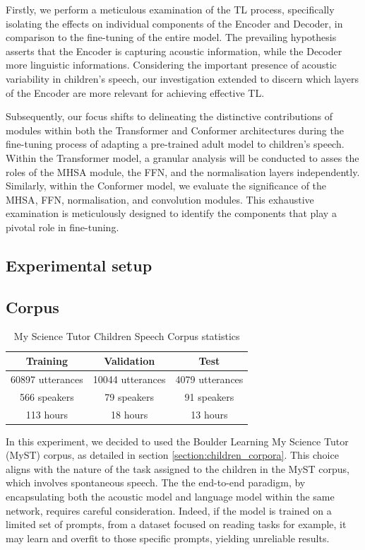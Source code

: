 Firstly, we perform a meticulous examination of the \ac{TL} process, specifically isolating the effects on individual components of the Encoder and Decoder, in comparison to the fine-tuning of the entire model. The prevailing hypothesis asserts that the Encoder is  capturing acoustic information, while the Decoder more linguistic informations. Considering the important presence of acoustic variability in children's speech, our investigation extended to discern which layers of the Encoder are more relevant for achieving effective \ac{TL}.

Subsequently, our focus shifts to delineating the distinctive contributions of modules within both the Transformer and Conformer architectures during the fine-tuning process of adapting a pre-trained adult model to children's speech. Within the Transformer model, a granular analysis will be conducted to asses the roles of the \ac{MHSA} module, the \ac{FFN}, and the normalisation layers independently. Similarly, within the Conformer model, we evaluate the significance of the \ac{MHSA}, \ac{FFN}, normalisation, and convolution modules. This exhaustive examination is meticulously designed to identify the components that play a pivotal role in fine-tuning.


\subsection{Experimental setup}
\label{section:methods_chapter4}

\subsection{Corpus}
\begin{table}[ht]
\centering
\begin{tabular}{c|c|c}
\hline
 Training & Validation     & Test   \\ \hline
60897 utterances  & 10044 utterances   & 4079 utterances \\ 
 566 speakers  & 79 speakers   & 91 speakers \\ 
 113 hours  & 18 hours   & 13 hours \\ \hline

\end{tabular}
\caption{My Science Tutor Children Speech Corpus statistics}
\label{tab:statistics_myst}
\end{table}
In this experiment, we decided to used  the Boulder Learning My Science Tutor (MyST) corpus, as detailed in section \ref{section:children_corpora}. This choice aligns with the nature of the task assigned to the children in the MyST corpus, which involves spontaneous speech. The the end-to-end paradigm, by encapsulating both the acoustic model and language model within the same network, requires careful consideration. Indeed, if the model is trained on a limited set of prompts, from a dataset focused on reading tasks for example, it may learn and overfit to those specific prompts, yielding unreliable results.

